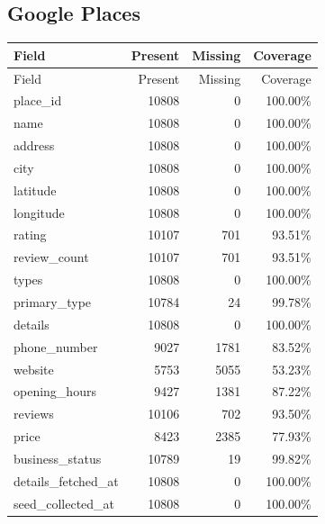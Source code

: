 \subsection{Google Places}
{\small
\begin{longtable}{lrrr}
\toprule
Field & Present & Missing & Coverage \\
\midrule
\endfirsthead
\toprule
Field & Present & Missing & Coverage \\
\midrule
\endhead
place\_id & 10808 & 0 & 100.00\% \\
name & 10808 & 0 & 100.00\% \\
address & 10808 & 0 & 100.00\% \\
city & 10808 & 0 & 100.00\% \\
latitude & 10808 & 0 & 100.00\% \\
longitude & 10808 & 0 & 100.00\% \\
rating & 10107 & 701 & 93.51\% \\
review\_count & 10107 & 701 & 93.51\% \\
types & 10808 & 0 & 100.00\% \\
primary\_type & 10784 & 24 & 99.78\% \\
details & 10808 & 0 & 100.00\% \\
phone\_number & 9027 & 1781 & 83.52\% \\
website & 5753 & 5055 & 53.23\% \\
opening\_hours & 9427 & 1381 & 87.22\% \\
reviews & 10106 & 702 & 93.50\% \\
price & 8423 & 2385 & 77.93\% \\
business\_status & 10789 & 19 & 99.82\% \\
details\_fetched\_at & 10808 & 0 & 100.00\% \\
seed\_collected\_at & 10808 & 0 & 100.00\% \\
\bottomrule
\end{longtable}
}
